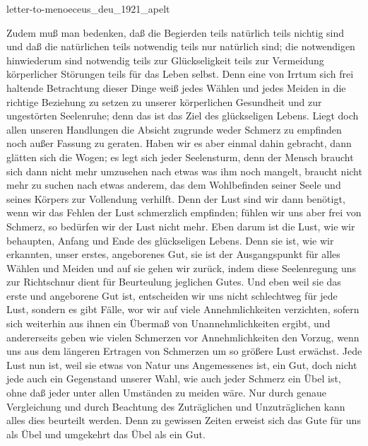 \documentclass{stex}
\begin{document}
\begin{smodule}{letter-to-menoeceus_deu_1921_apelt}
\begin{sparagraph}[id=letter-to-menoeceus,name=Letter to Menoeceus]
  Zudem muß man bedenken, daß die Begierden teils natürlich teils nichtig sind und daß die natürlichen teils notwendig teils nur natürlich sind; die notwendigen hinwiederum sind notwendig teils zur Glückseligkeit teils zur Vermeidung körperlicher Störungen teils für das Leben selbst.
  Denn eine von Irrtum sich frei haltende Betrachtung dieser Dinge weiß jedes Wählen und jedes Meiden in die richtige Beziehung zu setzen zu unserer körperlichen Gesundheit und zur ungestörten Seelenruhe; denn das ist das Ziel des glückseligen Lebens.
  Liegt doch allen unseren Handlungen die Absicht zugrunde weder Schmerz zu empfinden noch außer Fassung zu geraten.
  Haben wir es aber einmal dahin gebracht, dann glätten sich die Wogen; es legt sich jeder Seelensturm, denn der Mensch braucht sich dann nicht mehr umzusehen nach etwas was ihm noch mangelt, braucht nicht mehr zu suchen nach etwas anderem, das dem Wohlbefinden seiner Seele und seines Körpers zur Vollendung verhilft.
  Denn der Lust sind wir dann benötigt, wenn wir das Fehlen der Lust schmerzlich empfinden; fühlen wir uns aber frei von Schmerz, so bedürfen wir der Lust nicht mehr.
  Eben darum ist die Lust, wie wir behaupten, Anfang und Ende des glückseligen Lebens.
  Denn sie ist, wie wir erkannten, unser erstes, angeborenes Gut, sie ist der Ausgangspunkt für alles Wählen und Meiden und auf sie gehen wir zurück, indem diese Seelenregung uns zur Richtschnur dient für Beurteulung jeglichen Gutes.
  Und eben weil sie das erste und angeborene Gut ist, entscheiden wir uns nicht schlechtweg für jede Lust, sondern es gibt Fälle, wor wir auf viele Annehmlichkeiten verzichten, sofern sich weiterhin aus ihnen ein Übermaß von Unannehmlichkeiten ergibt, und andererseits geben wie vielen Schmerzen vor Annehmlichkeiten den Vorzug, wenn uns aus dem längeren Ertragen von Schmerzen um so größere Lust erwächst.
  Jede Lust nun ist, weil sie etwas von Natur uns Angemessenes ist, ein Gut, doch nicht jede auch ein Gegenstand unserer Wahl, wie auch jeder Schmerz ein Übel ist, ohne daß jeder unter allen Umständen zu meiden wäre.
  Nur durch genaue Vergleichung und durch Beachtung des Zuträglichen und Unzuträglichen kann alles dies beurteilt werden.
  Denn zu gewissen Zeiten erweist sich das Gute für uns als Übel und umgekehrt das Übel als ein Gut.


\end{sparagraph}
\end{smodule}
\end{document}

